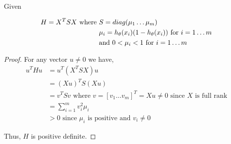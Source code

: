 \documentclass{article}
\begin{document}
\subsection{}
Given

\begin{equation}
  \label{eq:1.5}
  \begin{split}
  H = X^T S X  \text{ where } &S = diag(\mu_1 \hdots \mu_m) \\
                              &\mu_i = h_\theta(x_i)(1-h_\theta(x_i)) \text{ for } i = 1 \hdots m \\
                              &\text{and } 0 < \mu_i < 1 \text{ for } i = 1 \hdots m
  \end{split}
\end{equation}

\begin{proof}
For any vector $u \neq 0$ we have,
\begin{equation}
  \label{eq:1.6}
  \begin{split}
    u^T H u  &= u^T (X^T S X) u \\
             &= (Xu)^T S (Xu)  \\
             &= v^T S v \text{ where } v = [v_1 \hdots v_m]^T = Xu \neq 0 \text{ since $X$ is full rank} \\
             &= \sum_{i=1}^{m}v_i^2 \mu_i \\
             &> 0 \text{ since $\mu_i$  is positive and $v_i \neq 0$} 
  \end{split}
\end{equation}

Thus, $H$ is positive definite.
\end{proof}
\end{document}
